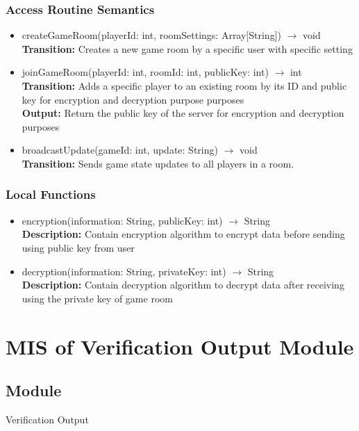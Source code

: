 \documentclass[12pt, titlepage]{article}
\begin{document}
\subsubsection{Access Routine Semantics}

\begin{itemize}
\item createGameRoom(playerId: int, roomSettings: Array[String]) $\rightarrow$ void\\
\textbf{Transition:} Creates a new game room by a specific user with specific setting


\item joinGameRoom(playerId: int, roomId: int, publicKey: int) $\rightarrow$ int\\
\textbf{Transition:} Adds a specific player to an existing room by its ID and public key for encryption and decryption purpose purposes \\
\textbf{Output:} Return the public key of the server for encryption and decryption purposes

\item broadcastUpdate(gameId: int, update: String) $\rightarrow$ void\\
\textbf{Transition:} Sends game state updates to all players in a room.

\end{itemize}


\subsubsection{Local Functions}
\begin{itemize}
\item encryption(information: String, publicKey: int) $\rightarrow$ String\\
\textbf{Description:} Contain encryption algorithm to encrypt data before sending using public key from user
\item decryption(information: String, privateKey: int) $\rightarrow$ String\\ 
\textbf{Description:} Contain decryption algorithm to decrypt data after receiving using the private key of game room
\end{itemize}


\section{MIS of Verification Output Module}
\label{VOM}

\subsection{Module}
\hspace{1.5em}Verification Output
\end{document}
